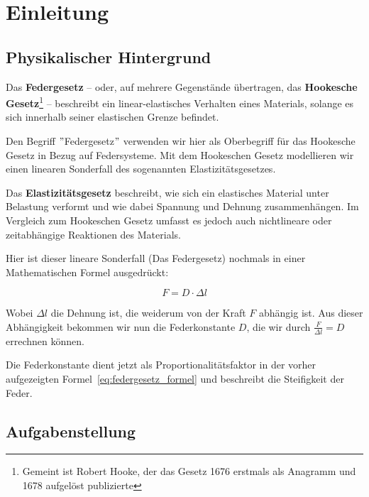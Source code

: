 \documentclass[../main.tex]{subfiles} %
\begin{document}
\section{Einleitung}\label{sec:einleitung}



    \subsection{Physikalischer Hintergrund}\label{subsec:physikalischer-hintergrund}
        Das \textbf{Federgesetz} – oder, auf mehrere Gegenstände übertragen, das \textbf{Hookesche Gesetz}\footnote{Gemeint ist Robert Hooke, der das Gesetz 1676 erstmals als Anagramm und 1678 aufgelöst publizierte} – beschreibt ein linear-elastisches Verhalten eines Materials, solange es sich innerhalb seiner elastischen Grenze befindet.

        Den Begriff \("\)Federgesetz\("\) verwenden wir hier als Oberbegriff für das Hookesche Gesetz in Bezug auf Federsysteme.
        Mit dem Hookeschen Gesetz modellieren wir einen linearen Sonderfall des sogenannten Elastizitätsgesetzes.

        \begin{tcolorbox}[title=Ausholung für das Elastizitätsgesetz]
            Das \textbf{Elastizitätsgesetz} beschreibt, wie sich ein elastisches Material unter Belastung verformt und wie dabei Spannung und Dehnung zusammenhängen.
            Im Vergleich zum Hookeschen Gesetz umfasst es jedoch auch nichtlineare oder zeitabhängige Reaktionen des Materials.
        \end{tcolorbox}

        Hier ist dieser lineare Sonderfall (Das Federgesetz) nochmals in einer Mathematischen Formel ausgedrückt:

        \begin{equation}
            F = D \cdot \Delta l
        \label{eq:federgesetz_formel}
        \end{equation}

        Wobei ${\Delta l}$ die Dehnung ist, die weiderum von der Kraft ${F}$ abhängig ist.
        Aus dieser Abhängigkeit bekommen wir nun die Federkonstante ${D}$, die wir durch ${\frac{F}{\Delta l} = D}$ errechnen können.

        Die Federkonstante dient jetzt als Proportionalitätsfaktor in der vorher aufgezeigten Formel~\ref{eq:federgesetz_formel} und beschreibt die Steifigkeit der Feder.


    \subsection{Aufgabenstellung}\label{subsec:aufgabenstellung}
\end{document}
